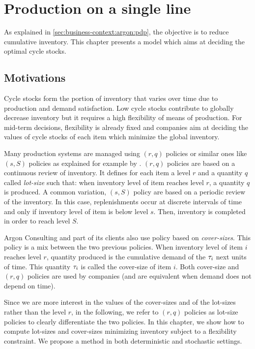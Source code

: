 \chapter{Production on a single line}
\label{chap:lot-size:single-line}


As explained in \cref{sec:business-context:argon:pdp}, the objective is to reduce cumulative inventory.
This chapter presents a model which aims at deciding the optimal cycle stocks.


\section{Motivations}
\label{sec:lot-size:single-line:motivations}


Cycle stocks form the portion of inventory that varies over time due to production and demand satisfaction.
Low cycle stocks contribute to globally decrease inventory but it requires a high flexibility of means of production.
For mid-term decisions, flexibility is already fixed and companies aim at deciding the values of cycle stocks of each item which minimize the global inventory.


Many production systems are managed using $(r,q)$ policies or similar ones like $(s,S)$ policies as explained for example by \citet{Arrow1951}.
$(r,q)$ policies are based on a continuous review of inventory.
It defines for each item a level $r$ and a quantity $q$ called \emph{lot-size} such that: when inventory level of item reaches level $r$, a quantity $q$ is produced.
A common variation, $(s,S)$ policy are based on a periodic review of the inventory.
In this case, replenishments occur at discrete intervals of time and only if inventory level of item is below level $s$.
Then, inventory is completed in order to reach level $S$.


Argon Consulting and part of its clients also use policy based on \emph{cover-sizes}.
This policy is a mix between the two previous policies.
When inventory level of item $i$ reaches level $r$, quantity produced is the cumulative demand of the $\tau_i$ next units of time.
This quantity $\tau_i$ is called the cover-size of item $i$.
Both cover-size and $(r,q)$ policies are used by companies (and are equivalent when demand does not depend on time).


Since we are more interest in the values of the cover-sizes and of the lot-sizes rather than the level $r$, in the following, we refer to $(r,q)$ policies as lot-size policies to clearly differentiate the two policies.
In this chapter, we show how to compute lot-sizes and cover-sizes minimizing inventory subject to a flexibility constraint.
We propose a method in both deterministic and stochastic settings.


